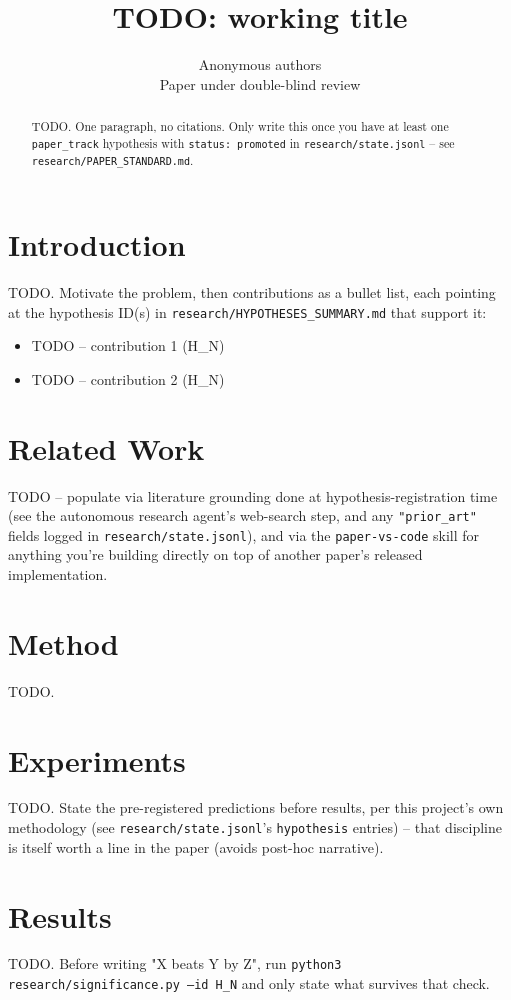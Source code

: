 \documentclass{article} %
\title{TODO: working title}
\author{Anonymous authors \\ Paper under double-blind review}
\begin{document}
\maketitle

\begin{abstract}
TODO. One paragraph, no citations. Only write this once you have at least one
\texttt{paper\_track} hypothesis with \texttt{status: promoted} in
\texttt{research/state.jsonl} -- see \texttt{research/PAPER\_STANDARD.md}.
\end{abstract}

\section{Introduction}
TODO. Motivate the problem, then contributions as a bullet list, each pointing
at the hypothesis ID(s) in \texttt{research/HYPOTHESES\_SUMMARY.md} that
support it:
\begin{itemize}
  \item TODO -- contribution 1 (H\_N)
  \item TODO -- contribution 2 (H\_N)
\end{itemize}

\section{Related Work}
TODO -- populate via literature grounding done at hypothesis-registration
time (see the autonomous research agent's web-search step, and any
\texttt{"prior\_art"} fields logged in \texttt{research/state.jsonl}), and via
the \texttt{paper-vs-code} skill for anything you're building directly on top
of another paper's released implementation.

\section{Method}
TODO.

\section{Experiments}
TODO. State the pre-registered predictions before results, per this
project's own methodology (see \texttt{research/state.jsonl}'s
\texttt{hypothesis} entries) -- that discipline is itself worth a line in the
paper (avoids post-hoc narrative).

\section{Results}
TODO. Before writing "X beats Y by Z", run
\texttt{python3 research/significance.py --id H\_N} and only state what
survives that check.
\end{document}
